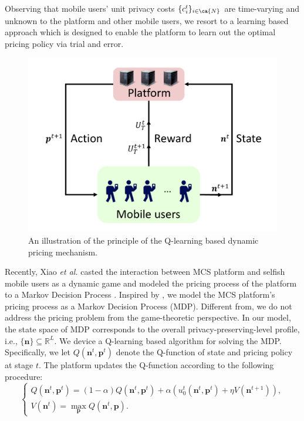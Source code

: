 Observing that mobile users' unit privacy costs $\{c^t_i\}_{i\in\ca{N}}$ are time-varying and unknown to the platform and other mobile users, we resort to a learning based approach which is designed to enable the platform to learn out the optimal pricing policy via trial and error. 
\begin{figure}[h]
\centering
\includegraphics[scale=0.44]{./pic/rl2.pdf}
\caption{An illustration of the principle of the Q-learning based dynamic pricing mechanism.}\label{RL}
\end{figure}
Recently, Xiao \textsl{et al.} casted the interaction between MCS platform and selfish mobile users as a dynamic game and modeled the pricing process of the platform to a Markov Decision Process \cite{Xiao}. Inspired by \cite{Xiao}, we model the MCS platform's pricing process as a Markov Decision Process (MDP). Different from\cite{Xiao}, we do not address the pricing problem from the game-theoretic perspective. In our model, the state space of MDP corresponds to the overall privacy-preserving-level profile, i.e., $\{\mathbf{n}\}\subseteq\mathds{R}^{L}$. We device a Q-learning based algorithm for solving the MDP\cite{Sutton98a}. Specifically, we let $Q(\mathbf{n}^t,\mathbf{p}^t)$ denote the Q-function of state and pricing policy at stage $t$. The platform updates the Q-function according to the following procedure:
\begin{equation}\label{update}
\begin{cases}
Q(\mathbf{n}^t,\mathbf{p}^t)=(1-\alpha)Q(\mathbf{n}^t,\mathbf{p}^t)+\alpha(u^t_0(\mathbf{n}^t,\mathbf{p}^t)+\eta V(\mathbf{n}^{t+1})),\\
V(\mathbf{n}^t)=\underset{\mathbf{p}}{\max}Q(\mathbf{n}^t,\mathbf{p}).
\end{cases}
\end{equation}
